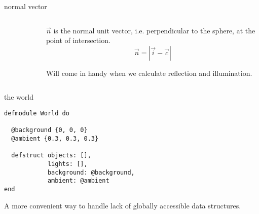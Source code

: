 \begin{frame}[fragile]{normal vector}


\begin{columns}
 \begin{column}{0.4\linewidth}
\begin{figure}
\end{figure}
 \end{column}
\pause
 \begin{column}{0.6\linewidth}
$\vec{n}$ is the normal unit vector, i.e. perpendicular to the sphere, at the point of intersection.
  $$\vec{n} = |\vec{i} - \vec{c}|$$
\pause 

Will come in handy when we calculate reflection and illumination.

 \end{column}
\end{columns}

\end{frame}

\begin{frame}[fragile]{the world}

\begin{verbatim}
defmodule World do

  @background {0, 0, 0}
  @ambient {0.3, 0.3, 0.3}

  defstruct objects: [],
            lights: [],
            background: @background,
            ambient: @ambient
end
\end{verbatim}

\pause A more convenient way to handle lack of  globally accessible data structures.
 
\end{frame}

